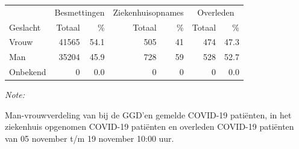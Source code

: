 \documentclass[
  english,
  man,floatsintext]{apa6}
\begin{document}
\begin{table}[H]
\centering\begingroup\fontsize{11}{13}\selectfont

\begin{threeparttable}
\begin{tabular}{lrrrrrr}
\toprule
\multicolumn{1}{c}{ } & \multicolumn{2}{c}{Besmettingen} & \multicolumn{2}{c}{Ziekenhuisopnames} & \multicolumn{2}{c}{Overleden} \\
\cmidrule(l{3pt}r{3pt}){2-3} \cmidrule(l{3pt}r{3pt}){4-5} \cmidrule(l{3pt}r{3pt}){6-7}
Geslacht & Totaal & \% & Totaal & \% & Totaal & \%\\
\midrule
Vrouw & 41565 & 54.1 & 505 & 41 & 474 & 47.3\\
Man & 35204 & 45.9 & 728 & 59 & 528 & 52.7\\
Onbekend & 0 & 0.0 & 0 & 0 & 0 & 0.0\\
\bottomrule
\end{tabular}
\begin{tablenotes}
\item \textit{Note: } 
\item Man-vrouwverdeling van bij de GGD’en gemelde COVID-19 patiënten, in het ziekenhuis opgenomen COVID-19 patiënten en overleden COVID-19 patiënten van 05 november t/m 19 november 10:00 uur.
\end{tablenotes}
\end{threeparttable}
\endgroup{}
\end{table}
\newpage
\end{document}
